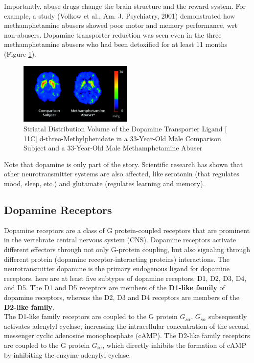 \documentclass{book}
\begin{document}
Importantly, abuse drugs change the brain structure and the reward system. 
For example, a study (Volkow et al., Am. J. Psychiatry, 2001) demonstrated how methamphetamine abusers showed poor motor and memory performance, wrt non-abusers.
Dopamine transporter reduction was seen even in the three methamphetamine abusers who had been detoxified for at least 11 months (Figure \ref{fig:mri}).

\begin{figure}
    \centering
    \includegraphics[width=0.5\textwidth]{images3/image11.png}
    \caption{\label{fig:mri}Striatal Distribution Volume of the Dopamine Transporter Ligand [ 11C] d-threo-Methylphenidate in a 33-Year-Old Male Comparison Subject and a 33-Year-Old Male Methamphetamine Abuser}
\end{figure}

Note that dopamine is only part of the story.
Scientific research has shown that other neurotransmitter systems are also affected, like serotonin (that regulates mood, sleep, etc.) and glutamate (regulates learning and memory).

\subsection{Dopamine Receptors}
Dopamine receptors are a class of G protein-coupled receptors that are prominent in the vertebrate central nervous system (CNS). 
Dopamine receptors activate different effectors through not only G-protein coupling, but also signaling through different protein (dopamine receptor-interacting proteins) interactions.
The neurotransmitter dopamine is the primary endogenous ligand for dopamine receptors.
here are at least five subtypes of dopamine receptors, D1, D2, D3, D4, and D5. The D1 and D5 receptors are members of the \textbf{D1-like family} of dopamine receptors, whereas the D2, D3 and D4 receptors are members of the \textbf{D2-like family}.
\\
The D1-like family receptors are coupled to the G protein $G_{s \alpha}$.
$G_{s \alpha}$ subsequently activates adenylyl cyclase, increasing the intracellular concentration of the second messenger cyclic adenosine monophosphate (cAMP).
The D2-like family receptors are coupled to the G protein $G_{i \alpha}$, which directly inhibits the formation of cAMP by inhibiting the enzyme adenylyl cyclase.
\end{document}
